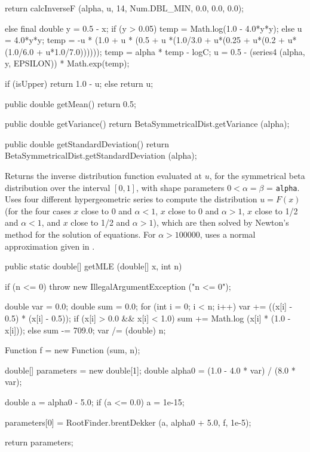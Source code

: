 \begin{code}
\begin{hide} {
      return calcInverseF (alpha, u, 14, Num.DBL_MIN, 0.0, 0.0, 0.0);
   }
{{{         } else {
            final double y = 0.5 - x;
            if (y > 0.05) {
               temp = Math.log(1.0 - 4.0*y*y);
            } else {
               u = 4.0*y*y;
               temp = -u * (1.0 + u * (0.5 + u *(1.0/3.0 + u*(0.25 +
                      u*(0.2 + u*(1.0/6.0 + u*1.0/7.0))))));
            }
            temp = alpha * temp - logC;
            u = 0.5 - (series4 (alpha, y, EPSILON)) * Math.exp(temp);
         }
      }

      if (isUpper)
         return 1.0 - u;
      else
         return u;
   }

   public double getMean() {
      return 0.5;
   }

   public double getVariance() {
      return BetaSymmetricalDist.getVariance (alpha);
   }

   public double getStandardDeviation() {
      return BetaSymmetricalDist.getStandardDeviation (alpha);
   }

\end{hide}\end{code}
\begin{tabb}
  Returns the inverse distribution function evaluated at $u$, for the
  symmetrical beta distribution over the interval $[0,1]$, with shape
  parameters $0 < \alpha = \beta$ = \texttt{alpha}.
  Uses four different hypergeometric series
  to compute the distribution $u = F(x)$
  (for the four cases $x$ close to 0 and $\alpha < 1$,
     $x$ close to 0 and $\alpha > 1$,  $x$ close to 1/2 and $\alpha < 1$,
  and  $x$ close to 1/2 and $\alpha > 1$),
  which are then solved by Newton's method for the solution of equations.
  For $\alpha > 100000$, uses a normal approximation given in \cite{tPEI68a}.
\end{tabb}
\begin{code}

   public static double[] getMLE (double[] x, int n)\begin{hide} {
      if (n <= 0)
         throw new IllegalArgumentException ("n <= 0");

      double var = 0.0;
      double sum = 0.0;
      for (int i = 0; i < n; i++)
      {
         var += ((x[i] - 0.5) * (x[i] - 0.5));
         if (x[i] > 0.0 && x[i] < 1.0)
            sum += Math.log (x[i] * (1.0 - x[i]));
         else
            sum -= 709.0;
      }
      var /= (double) n;

      Function f = new Function (sum, n);

      double[] parameters = new double[1];
      double alpha0 = (1.0 - 4.0 * var) / (8.0 * var);

      double a = alpha0 - 5.0;
      if (a <= 0.0)
         a = 1e-15;

      parameters[0] = RootFinder.brentDekker (a, alpha0 + 5.0, f, 1e-5);

      return parameters;
   }\end{hide}
\end{code}
